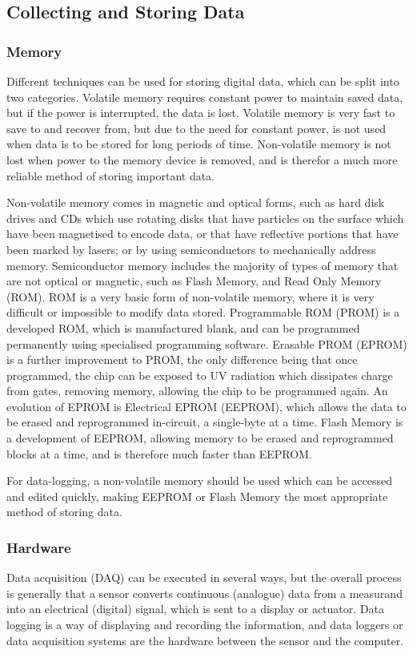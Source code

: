 \subsection{Collecting and Storing Data}
\subsubsection{Memory}
Different techniques can be used for storing digital data, which can be split into two categories. Volatile memory requires constant power to maintain saved data, but if the power is interrupted, the data is lost. Volatile memory is very fast to save to and recover from, but due to the need for constant power, is not used when data is to be stored for long periods of time. Non-volatile memory is not lost when power to the memory device is removed, and is therefor a much more reliable method of storing important data. 

Non-volatile memory comes in magnetic and optical forms, such as hard disk drives and CDs which use rotating disks that have particles on the surface which have been magnetised to encode data, or that have reflective portions that have been marked by lasers; or by using semiconductors to mechanically address memory. Semiconductor memory includes the majority of types of memory that are not optical or magnetic, such as Flash Memory, and Read Only Memory (ROM). ROM is a very basic form of non-volatile memory, where it is very difficult or impossible to modify data stored. Programmable ROM (PROM) is a developed ROM, which is manufactured blank, and can be programmed permanently using specialised programming software. Erasable PROM (EPROM) is a further improvement to PROM, the only difference being that once programmed, the chip can be exposed to UV radiation which dissipates charge from gates, removing memory, allowing the chip to be programmed again. An evolution of EPROM is Electrical EPROM (EEPROM), which allows the data to be erased and reprogrammed in-circuit, a single-byte at a time. Flash Memory is a development of EEPROM, allowing memory to be erased and reprogrammed blocks at a time, and is therefore much faster than EEPROM.

For data-logging, a non-volatile memory should be used which can be accessed and edited quickly, making EEPROM or Flash Memory the most appropriate method of storing data. 

\subsubsection{Hardware}
Data acquisition (DAQ) can be executed in several ways, but the overall process is generally that a sensor converts continuous (analogue) data from a measurand into an electrical (digital) signal, which is sent to a display or actuator. Data logging is a way of displaying and recording the information, and data loggers or data acquisition systems are the hardware between the sensor and the computer.

